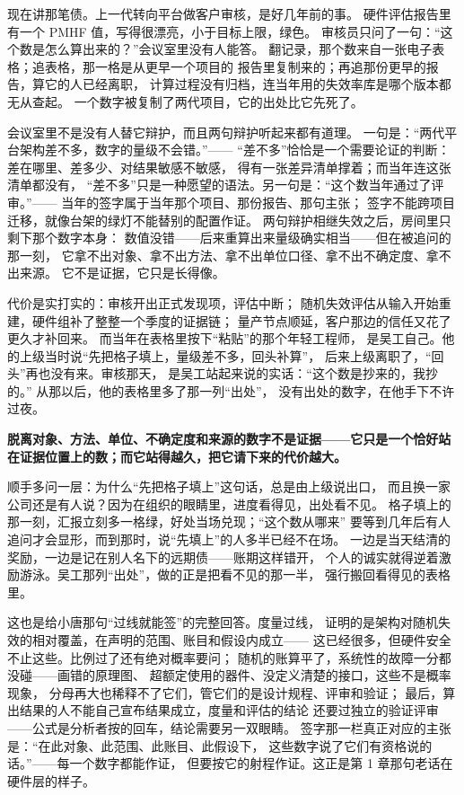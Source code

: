 现在讲那笔债。上一代转向平台做客户审核，是好几年前的事。
硬件评估报告里有一个 PMHF 值，写得很漂亮，小于目标上限，绿色。
审核员只问了一句：“这个数是怎么算出来的？”会议室里没有人能答。
翻记录，那个数来自一张电子表格；追表格，那一格是从更早一个项目的
报告里复制来的；再追那份更早的报告，算它的人已经离职，
计算过程没有归档，连当年用的失效率库是哪个版本都无从查起。
一个数字被复制了两代项目，它的出处比它先死了。

会议室里不是没有人替它辩护，而且两句辩护听起来都有道理。
一句是：“两代平台架构差不多，数字的量级不会错。”——
“差不多”恰恰是一个需要论证的判断：差在哪里、差多少、对结果敏感不敏感，
得有一张差异清单撑着；而当年连这张清单都没有，
“差不多”只是一种愿望的语法。另一句是：“这个数当年通过了评审。”——
当年的签字属于当年那个项目、那份报告、那句主张；
签字不能跨项目迁移，就像台架的绿灯不能替别的配置作证。
两句辩护相继失效之后，房间里只剩下那个数字本身：
数值没错——后来重算出来量级确实相当——但在被追问的那一刻，
它拿不出对象、拿不出方法、拿不出单位口径、拿不出不确定度、拿不出来源。
它不是证据，它只是长得像。

代价是实打实的：审核开出正式发现项，评估中断；
随机失效评估从输入开始重建，硬件组补了整整一个季度的证据链；
量产节点顺延，客户那边的信任又花了更久才补回来。
而当年在表格里按下“粘贴”的那个年轻工程师，
是吴工自己。他的上级当时说“先把格子填上，量级差不多，回头补算”，
后来上级离职了，“回头”再也没有来。审核那天，
是吴工站起来说的实话：“这个数是抄来的，我抄的。”
从那以后，他的表格里多了那一列“出处”，
没有出处的数字，在他手下不许过夜。

\textbf{脱离对象、方法、单位、不确定度和来源的数字不是证据——它只是一个恰好站在证据位置上的数；而它站得越久，把它请下来的代价越大。}

顺手多问一层：为什么“先把格子填上”这句话，总是由上级说出口，
而且换一家公司还是有人说？因为在组织的眼睛里，进度看得见，出处看不见。
格子填上的那一刻，汇报立刻多一格绿，好处当场兑现；“这个数从哪来”
要等到几年后有人追问才会显形，而到那时，说“先填上”的人多半已经不在场。
一边是当天结清的奖励，一边是记在别人名下的远期债——账期这样错开，
个人的诚实就得逆着激励游泳。吴工那列“出处”，做的正是把看不见的那一半，
强行搬回看得见的表格里。

这也是给小唐那句“过线就能签”的完整回答。度量过线，
证明的是架构对随机失效的相对覆盖，在声明的范围、账目和假设内成立——
这已经很多，但硬件安全不止这些。比例过了还有绝对概率要问；
随机的账算平了，系统性的故障一分都没碰——画错的原理图、
超额定使用的器件、没定义清楚的接口，这些不是概率现象，
分母再大也稀释不了它们，管它们的是设计规程、评审和验证；
最后，算出结果的人不能自己宣布结果成立，度量和评估的结论
还要过独立的验证评审——公式是分析者按的回车，结论需要另一双眼睛。
签字那一栏真正对应的主张是：“在此对象、此范围、此账目、此假设下，
这些数字说了它们有资格说的话。”——每一个数字都能作证，
但要按它的射程作证。这正是第 1 章那句老话在硬件层的样子。

